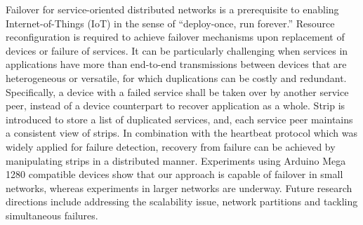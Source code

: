 \begin{abstractEN}

\noindent Failover for service-oriented distributed networks is a prerequisite
to enabling Internet-of-Things (IoT) in the sense of “deploy-once, run forever.”
Resource reconfiguration is required to achieve failover mechanisms upon
replacement of devices or failure of services. It can be particularly
challenging when services in applications have more than end-to-end
transmissions between devices that are heterogeneous or versatile, for which
duplications can be costly and redundant. Specifically, a device with a failed
service shall be taken over by another service peer, instead of a device
counterpart to recover application as a whole. Strip is introduced to store
a list of duplicated services, and, each service peer maintains a consistent
view of strips. In combination with the heartbeat protocol which was widely
applied for failure detection, recovery from failure can be achieved by
manipulating strips in a distributed manner. Experiments using Arduino Mega 1280
compatible devices show that our approach is capable of failover in small
networks, whereas experiments in larger networks are underway. Future research
directions include addressing the scalability issue, network partitions and
tackling simultaneous failures.

\end{abstractEN}

\begin{comment}


\terms{System, Policy}

\keywords{Service-Oriented WSN, Fault Tolerance}

\end{comment}
